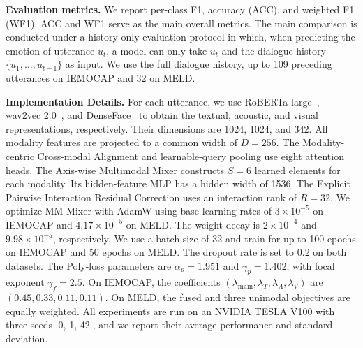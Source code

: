 \documentclass[letterpaper]{article} %
\begin{document}
\noindent\textbf{Evaluation metrics.}
We report per-class F1, accuracy (ACC), and weighted F1 (WF1). ACC and WF1 serve as the main overall metrics. The main comparison is conducted under a history-only evaluation protocol in which, when predicting the emotion of utterance $u_t$, a model can only take  $u_{t}$ and
the dialogue history $\{u_1,\ldots,u_{t-1}\}$ as input.
We use the full dialogue history, up to 109 preceding utterances on
IEMOCAP and 32 on MELD.

\noindent\textbf{Implementation Details.}
For each utterance, we use RoBERTa-large~\cite{liu2019roberta},
wav2vec 2.0~\cite{baevski2020wav2vec}, and
DenseFace~\cite{zhao2018emotion} to obtain the textual, acoustic, and
visual representations, respectively. Their dimensions are 1024,
1024, and 342. %
All modality features are projected to a common width of $D=256$.
The Modality-centric Cross-modal Alignment and learnable-query pooling
use eight attention heads. The Axis-wise Multimodal Mixer constructs
$S=6$ learned elements for each modality. Its hidden-feature MLP has a
hidden width of 1536. The Explicit Pairwise
Interaction Residual Correction uses an interaction rank of $R=32$.
We optimize MM-Mixer with AdamW using base learning rates of
$3\times10^{-5}$ on IEMOCAP and $4.17\times10^{-5}$ on MELD. The
weight decay is $2\times10^{-4}$ and $9.98\times10^{-5}$,
respectively. We use a batch size of 32 and train for up to 100 epochs
on IEMOCAP and 50 epochs on MELD. The dropout rate is set to 0.2 on
both datasets. The Poly-loss parameters are
$\alpha_p=1.951$ and $\gamma_p=1.402$, with focal exponent
$\gamma_f=2.5$. On IEMOCAP, the coefficients
$(\lambda_{\mathrm{main}},\lambda_T,\lambda_A,\lambda_V)$ are
$(0.45,0.33,0.11,0.11)$. On MELD, the fused and three unimodal
objectives are equally weighted. All experiments are run on an NVIDIA TESLA V100 with three seeds [0, 1, 42], and we report their average performance and standard deviation.
\end{document}
